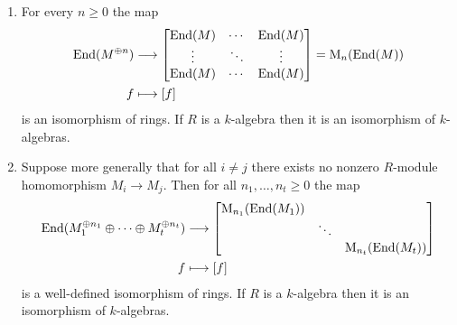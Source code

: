 \begin{corollary}
  \label{corollary: decomposition of endomorphisms for orthogonal modules}
  \leavevmode
  \begin{enumerate}
    \item
      For every $n \geq 0$ the map
      \begin{align*}
                  \operatorname{End}(M^{\oplus n})
        &\longrightarrow  \begin{bmatrix}
                    \operatorname{End}(M) & \cdots  & \operatorname{End}(M) \\
                    \vdots  & \ddots  & \vdots  \\
                    \operatorname{End}(M) & \cdots  & \operatorname{End}(M)
                  \end{bmatrix}
        =        \operatorname{M}_n( \operatorname{End}(M) )
        \\
                      f
        &\longmapsto  [f]
      \end{align*}
      is an isomorphism of rings.
      If $R$ is a $k$-algebra then it is an isomorphism of $k$-algebras.
    \item
      Suppose more generally that for all $i \neq j$ there exists no nonzero $R$-module homomorphism $M_i \to M_j$. Then for all $n_1, \dotsc, n_t \geq 0$ the map
      \begin{align*}
                  \operatorname{End}(M_1^{\oplus n_1} \oplus \dotsb \oplus M_t^{\oplus n_t})
        &\longrightarrow  \begin{bmatrix}
                      \operatorname{M}_{n_1}( \operatorname{End}(M_1) )
                    & {}
                    & {}
                    \\
                      {}
                    & \ddots
                    & {}
                    \\
                      {}
                    & {}
                    & \operatorname{M}_{n_t}( \operatorname{End}(M_t) )
                  \end{bmatrix}
        \\
                      f
        &\longmapsto  [f]
      \end{align*}
      is a well-defined isomorphism of rings.
      If $R$ is a $k$-algebra then it is an isomorphism of $k$-algebras.
  \end{enumerate}
\end{corollary}





